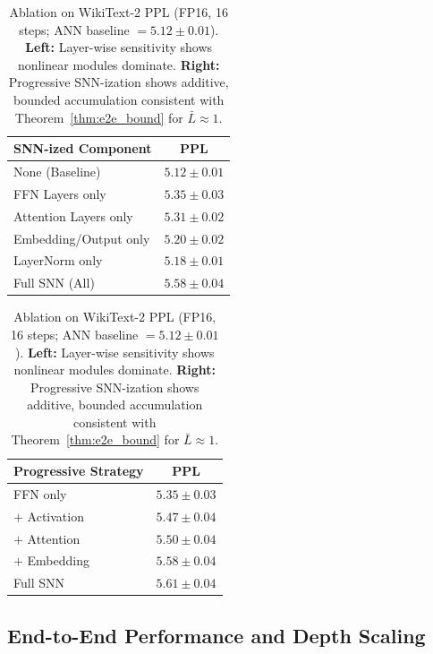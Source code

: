 \documentclass{article}
\theoremstyle{plain}
\theoremstyle{definition}
\theoremstyle{remark}
\begin{document}
\begin{table}[h!]
\centering
\caption{Ablation on WikiText-2 PPL (FP16, 16 steps; ANN baseline $= 5.12 \pm
0.01$). \textbf{Left:} Layer-wise sensitivity shows nonlinear modules dominate.
\textbf{Right:} Progressive SNN-ization shows additive, bounded accumulation
consistent with Theorem~\ref{thm:e2e_bound} for $\bar{L} \approx 1$.}
\label{tab:ablation}
\vspace{0.4em}
\begin{minipage}[t]{0.48\textwidth}
\centering
\small
\begin{tabular}{lc}
\toprule
\textbf{SNN-ized Component} & \textbf{PPL} \\
\midrule
None (Baseline)           & $5.12 \pm 0.01$ \\
FFN Layers only           & $5.35 \pm 0.03$ \\
Attention Layers only     & $5.31 \pm 0.02$ \\
Embedding/Output only     & $5.20 \pm 0.02$ \\
LayerNorm only            & $5.18 \pm 0.01$ \\
Full SNN (All)            & $5.58 \pm 0.04$ \\
\bottomrule
\end{tabular}
\end{minipage}
\hfill
\begin{minipage}[t]{0.48\textwidth}
\centering
\small
\begin{tabular}{lc}
\toprule
\textbf{Progressive Strategy} & \textbf{PPL} \\
\midrule
FFN only                & $5.35 \pm 0.03$ \\
$+$ Activation          & $5.47 \pm 0.04$ \\
$+$ Attention           & $5.50 \pm 0.04$ \\
$+$ Embedding           & $5.58 \pm 0.04$ \\
Full SNN                & $5.61 \pm 0.04$ \\
\bottomrule
\end{tabular}
\end{minipage}
\end{table}


\subsection{End-to-End Performance and Depth Scaling}
\label{subsec:exp_scale}
\end{document}
